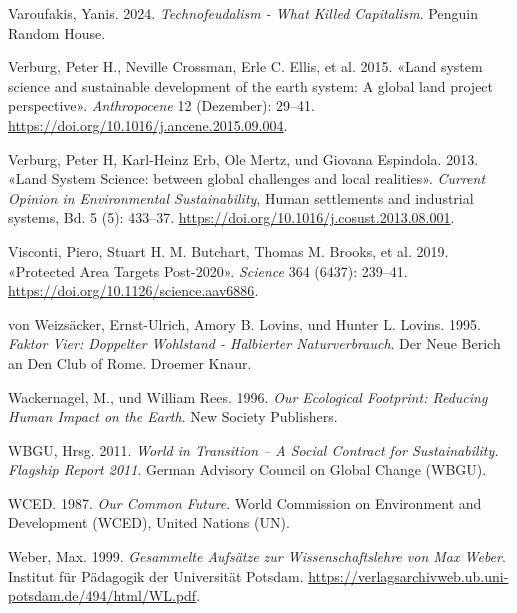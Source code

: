\documentclass[
  nswissgerman,
  a4paper,
  DIV=11,
  numbers=noendperiod,
  oneside,
  openany]{scrreprt}
\newlength{\cslhangindent}
\newenvironment{CSLReferences}[2] %
 {\begin{list}{}{%
  \setlength{\itemindent}{0pt}
  \setlength{\leftmargin}{0pt}
  \setlength{\parsep}{0pt}
  \ifodd #1
   \setlength{\leftmargin}{\cslhangindent}
   \setlength{\itemindent}{-1\cslhangindent}
  \fi
  \setlength{\itemsep}{#2\baselineskip}}}
 {\end{list}}
\begin{document}
\begin{CSLReferences}{1}{1}
Varoufakis, Yanis. 2024. \emph{Technofeudalism - {What} Killed
Capitalism}. Penguin Random House.

Verburg, Peter H., Neville Crossman, Erle C. Ellis, et al. 2015. {«Land
system science and sustainable development of the earth system: {A}
global land project perspective»}. \emph{Anthropocene} 12 (Dezember):
29--41. \url{https://doi.org/10.1016/j.ancene.2015.09.004}.

Verburg, Peter H, Karl-Heinz Erb, Ole Mertz, und Giovana Espindola.
2013. {«Land {System} {Science}: between global challenges and local
realities»}. \emph{Current Opinion in Environmental Sustainability},
Human settlements and industrial systems, Bd. 5 (5): 433--37.
\url{https://doi.org/10.1016/j.cosust.2013.08.001}.

Visconti, Piero, Stuart H. M. Butchart, Thomas M. Brooks, et al. 2019.
{«Protected Area Targets Post-2020»}. \emph{Science} 364 (6437):
239--41. \url{https://doi.org/10.1126/science.aav6886}.

{von Weizsäcker, Ernst-Ulrich, Amory B. Lovins, und Hunter L. Lovins}.
1995. \emph{Faktor {Vier}: {Doppelter Wohlstand} - Halbierter
{Naturverbrauch}}. Der Neue {Berich} an Den {Club} of {Rome}. Droemer
Knaur.

Wackernagel, M., und William Rees. 1996. \emph{Our {Ecological
Footprint}: {Reducing Human Impact} on the {Earth}}. New Society
Publishers.

WBGU, Hrsg. 2011. \emph{World in {Transition} -- {A} {Social} {Contract}
for {Sustainability}. {Flagship} {Report} 2011}. German Advisory Council
on Global Change (WBGU).

WCED. 1987. \emph{Our {Common Future}}. {World Commission on Environment
and Development (WCED), United Nations (UN)}.

Weber, Max. 1999. \emph{Gesammelte {Aufsätze} zur {Wissenschaftslehre}
von {Max} {Weber}}. Institut für Pädagogik der Universität Potsdam.
\url{https://verlagsarchivweb.ub.uni-potsdam.de/494/html/WL.pdf}.


\end{CSLReferences}
\end{document}
